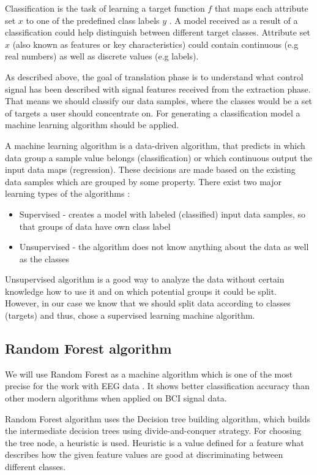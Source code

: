 \documentclass[12pt]{article}
\theoremstyle{definition}
\begin{document}
Classification is the task of learning a target function $f$ that maps each attribute set $x$ to one of the predefined class labels $y$ \cite{classification_basics}. A model received as a result of a classification could help distinguish between different target classes. Attribute set $x$ (also known as features or key characteristics) could contain continuous (e.g real numbers) as well as discrete values (e.g labels).

As described above, the goal of translation phase is to understand what control signal has been described with signal features received from the extraction phase. That means we should classify our data samples, where the classes would be a set of targets a user should concentrate on. For generating a classification model a machine learning algorithm should be applied. 

A machine learning algorithm is a data-driven algorithm, that predicts in which data group a sample value belongs (classification) or which continuous output the input data maps (regression). These decisions are made based on the existing data samples which are grouped by some property. There exist two major learning types of the algorithms \cite{ml_types}:
\begin{itemize}
\item Supervised - creates a model with labeled (classified) input data samples, so that groups of data have own class label
\item Unsupervised - the algorithm does not know anything about the data as well as the classes
\end{itemize}
Unsupervised algorithm is a good way to analyze the data without certain knowledge how to use it and on which potential groups it could be split. However, in our case we know that we should split data according to classes (targets) and thus, chose a supervised learning machine algorithm.

\subsection{Random Forest algorithm}

We will use Random Forest as a machine algorithm which is one of the most precise for the work with EEG data \cite{masso}. It shows better classification accuracy than other modern algorithms when applied on BCI signal data. 

Random Forest algorithm uses the Decision tree building algorithm, which builds the intermediate decision trees using divide-and-conquer strategy. For choosing the tree node, a heuristic is used. Heuristic is a value defined for a feature what describes how the given feature values are good at discriminating between different classes. \cite{hyper-heur}
\end{document}
